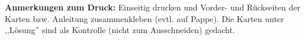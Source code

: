 \documentclass[parskip]{scrartcl}
\begin{document}
\vspace{-0.5cm}\pagestyle{fancy}
\textcolor{darkpink}{\textbf{Anmerkungen zum Druck:}} Einseitig drucken und Vorder- und Rückseiten der Karten bzw. Anleitung zusammenkleben (evtl. auf Pappe). Die Karten unter ,,Lösung'' sind als Kontrolle (nicht zum Ausschneiden) gedacht.\\
\vspace{-0.2cm}\\
%
\end{document}
